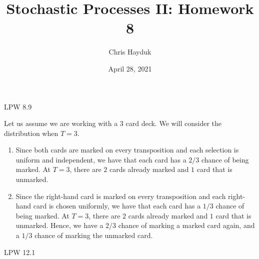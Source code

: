 \documentclass[12pt]{article}
\newenvironment{problem}[2][Problem]{\begin{trivlist}
\item[\hskip \labelsep {\bfseries #1}\hskip \labelsep {\bfseries #2.}]}{\end{trivlist}}
\begin{document}
\title{Stochastic Processes II: Homework 8}

\author{Chris Hayduk}
\date{April 28, 2021}

\maketitle

\begin{problem}{I}
LPW 8.9
\end{problem}

Let us assume we are working with a $3$ card deck. We will consider the distribution when $T = 3$.

\begin{enumerate}[\alph*)]

\item Since both cards are marked on every transposition and each selection is uniform and independent, we have that each card has a $2/3$ chance of being marked. At $T = 3$, there are $2$ cards already marked and $1$ card that is unmarked.

\item Since the right-hand card is marked on every transposition and each right-hand card is chosen uniformly, we have that each card has a $1/3$ chance of being marked. At $T = 3$, there are $2$ cards already marked and $1$ card that is unmarked. Hence, we have a $2/3$ chance of marking a marked card again, and a $1/3$ chance of marking the unmarked card.

\end{enumerate}

\begin{problem}{II}
LPW 12.1
\end{problem}
\end{document}
